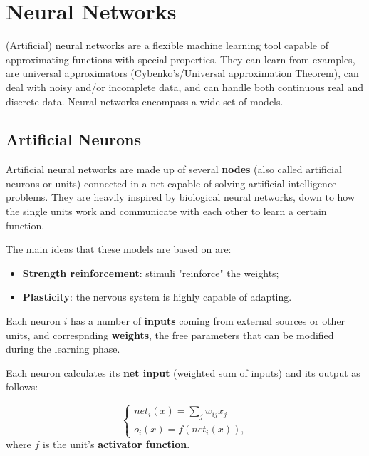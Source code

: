 \chapter{Neural Networks}

(Artificial) neural networks are a flexible machine learning tool capable of approximating functions with special properties. They can learn from examples, are universal approximators (\href{https://en.wikipedia.org/wiki/Universal_approximation_theorem}{Cybenko's/Universal approximation Theorem}), can deal with noisy and/or incomplete data, and can handle both continuous real and discrete data. Neural networks encompass a wide set of models.

\section{Artificial Neurons}

Artificial neural networks are made up of several \textbf{nodes} (also called artificial neurons or units) connected in a net capable of solving artificial intelligence problems. They are heavily inspired by biological neural networks, down to how the single units work and communicate with each other to learn a certain function.

The main ideas that these models are based on are:

\begin{itemize}
    \item \textbf{Strength reinforcement}: stimuli "reinforce" the weights;

    \item \textbf{Plasticity}: the nervous system is highly capable of adapting.
\end{itemize}

Each neuron $i$ has a number of \textbf{inputs} coming from external sources or other units, and correspnding \textbf{weights}, the free parameters that can be modified during the learning phase.

Each neuron calculates its \textbf{net input} (weighted sum of inputs) and its output as follows:

\begin{equation*}
    \begin{cases}
        net_i(x) = \sum_j w_{ij} x_j \\
        o_i(x) = f(net_i(x)),
    \end{cases}
\end{equation*}
where $f$ is the unit's \textbf{activator function}.

